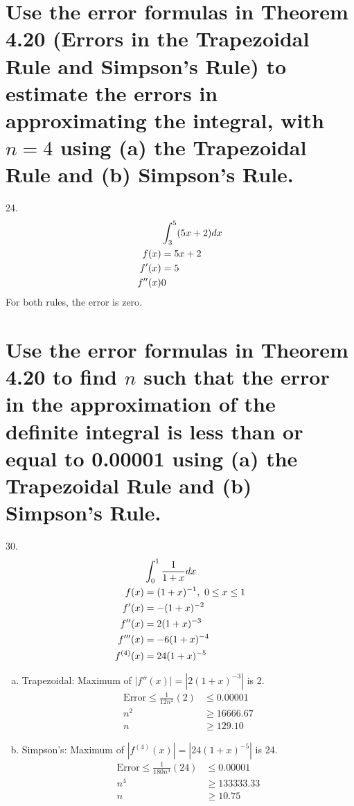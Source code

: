 \documentclass[11pt]{article}
\newcommand*{\set}{\setcounter{equation}{0}}
\begin{document}
\section{Use the error formulas in Theorem 4.20 (Errors in the Trapezoidal Rule and Simpson's Rule) to
estimate the errors in approximating the integral, with $n=4$
using (a) the Trapezoidal Rule and (b) Simpson’s Rule.}
24.\begin{align}
    \set
    &\int_{3}^{5}(5x+2)dx\\
    f(x)&=5x+2\\
    f'(x)&=5\\
    f''(x)&0
\end{align}
For both rules, the error is zero.

\section{Use the error formulas in Theorem 4.20 to
find $n$ such that the error in the approximation of the definite
integral is less than or equal to 0.00001 using (a) the Trapezoidal
Rule and (b) Simpson’s Rule.}
30.\begin{align}
    \set
    &\int_{0}^{1}\frac{1}{1+x}dx\\
    f(x)&=(1+x)^{-1},\,\, 0\leq x\leq 1\\
    f'(x)&=-(1+x)^{-2}\\
    f''(x)&=2(1+x)^{-3}\\
    f'''(x)&=-6(1+x)^{-4}\\
    f^{(4)}(x)&=24(1+x)^{-5}
\end{align}
\begin{enumerate}[(a)]
    \item Trapezoidal: Maximum of $|f''(x)|=|2(1+x)^{-3}|$ is 2.    
        \begin{align}
            \text{Error}\leq\frac{1}{12n^2}(2)&\leq 0.00001\\
            n^2&\geq16666.67\\
            n&\geq 129.10
        \end{align}
    \item Simpson's: Maximum of $|f^{(4)}(x)|=|24(1+x)^{-5}|$ is 24.
        \begin{align}
            \text{Error}\leq\frac{1}{180n^4}(24)&\leq 0.00001\\
            n^4&\geq133333.33\\
            n&\geq 10.75  
        \end{align}
\end{enumerate}
\end{document}
